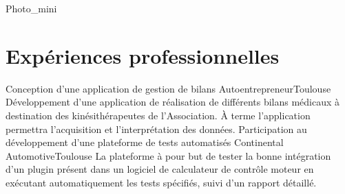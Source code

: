 \documentclass{my_cv_bis}
\begin{document}
 {
}{Photo_mini}

%


 
 \vspace{-5mm}
\section{Expériences professionnelles}
	{Conception d’une application de gestion de bilans}
	{Autoentrepreneur}{Toulouse}
	{
	Développement d'une application de réalisation de différents bilans médicaux à destination des kinésithérapeutes 
	de l'Association. À terme l'application permettra l'acquisition et l'interprétation des données.
	}
	{}
	{Participation au développement d'une plateforme de tests automatisés}
	{Continental Automotive}{Toulouse}
	{
	La plateforme à pour but de tester la bonne intégration d'un plugin présent dans un logiciel de calculateur de contrôle moteur en exécutant
	automatiquement les tests spécifiés, suivi d'un rapport détaillé.
	}
	{}
\end{document}
